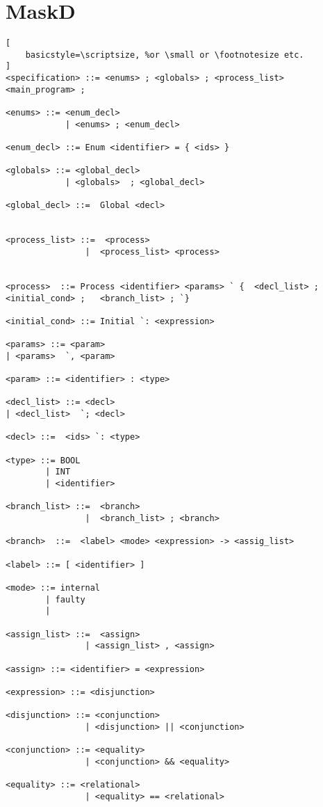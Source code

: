 \section{MaskD } \label{sec:maskDGrammar}

\begin{lstlisting}[
    basicstyle=\scriptsize, %or \small or \footnotesize etc.
]
<specification> ::= <enums> ; <globals> ; <process_list>  <main_program> ;

<enums> ::= <enum_decl>
            | <enums> ; <enum_decl>

<enum_decl> ::= Enum <identifier> = { <ids> }

<globals> ::= <global_decl>
            | <globals>  ; <global_decl>

<global_decl> ::=  Global <decl>


<process_list> ::=  <process>
                |  <process_list> <process>


<process>  ::= Process <identifier> <params> ` {  <decl_list> ; <initial_cond> ;   <branch_list> ; `}

<initial_cond> ::= Initial `: <expression>

<params> ::= <param> 
| <params>  `, <param>

<param> ::= <identifier> : <type>

<decl_list> ::= <decl> 
| <decl_list>  `; <decl>

<decl> ::=  <ids> `: <type> 

<type> ::= BOOL 
        | INT 
        | <identifier>

<branch_list> ::=  <branch> 
                |  <branch_list> ; <branch>

<branch>  ::=  <label> <mode> <expression> -> <assig_list>

<label> ::= [ <identifier> ]

<mode> ::= internal
        | faulty
        |

<assign_list> ::=  <assign>
                | <assign_list> , <assign>

<assign> ::= <identifier> = <expression>
            
<expression> ::= <disjunction>

<disjunction> ::= <conjunction> 
                | <disjunction> || <conjunction>
                
<conjunction> ::= <equality> 
                | <conjunction> && <equality>

<equality> ::= <relational> 
                | <equality> == <relational>


\end{lstlisting}
